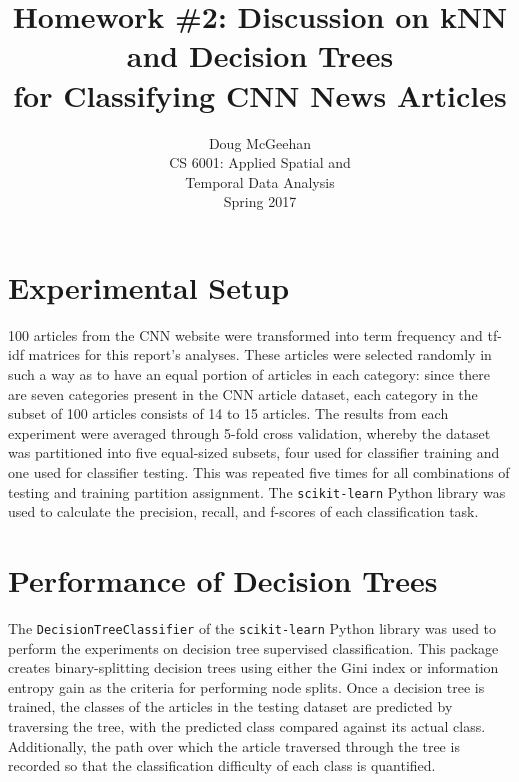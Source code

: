 \documentclass[11pt]{article}
\title{Homework \#2: Discussion on kNN and Decision Trees\\ for Classifying CNN News Articles}
\author{Doug McGeehan\\
		CS 6001: Applied Spatial and \\ Temporal Data Analysis\\
		Spring 2017}
\begin{document}
\maketitle

\section{Experimental Setup}

100 articles from the CNN website were transformed into term frequency and tf-idf matrices for this report's analyses.
These articles were selected randomly in such a way as to have an equal portion of articles in each category: since there are seven categories present in the CNN article dataset, each category in the subset of 100 articles consists of 14 to 15 articles.
The results from each experiment were averaged through 5-fold cross validation,
 whereby the dataset was partitioned into five equal-sized subsets, four used for classifier training and one used for classifier testing.
This was repeated five times for all combinations of testing and training partition assignment.
The \texttt{scikit-learn} Python library was used to calculate the precision, recall, and f-scores of each classification task.

\section{Performance of Decision Trees} \label{sec:tree}

The \texttt{DecisionTreeClassifier} of the \texttt{scikit-learn} Python library was used to perform the experiments on decision tree supervised classification.
This package creates binary-splitting decision trees using either the Gini index or information entropy gain as the criteria for performing node splits.
Once a decision tree is trained, the classes of the articles in the testing dataset are predicted by traversing the tree, with the predicted class compared against its actual class.
Additionally, the path over which the article traversed through the tree is recorded so that the classification difficulty of each class is quantified.
\end{document}
